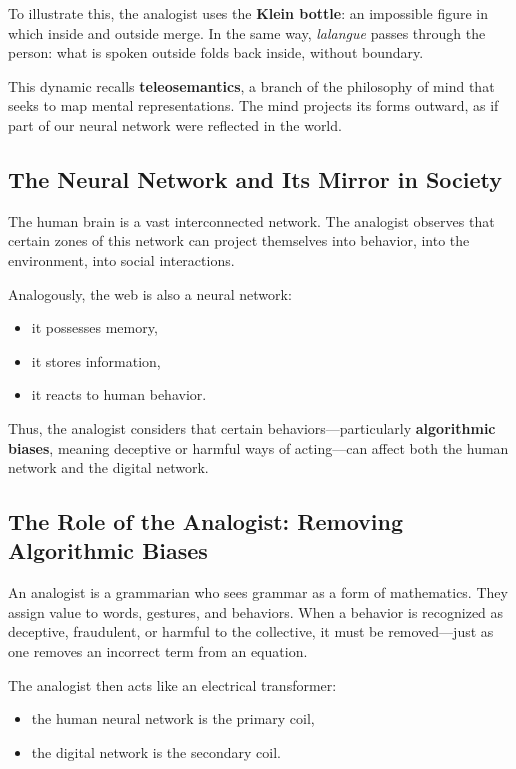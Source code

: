 \documentclass[12pt,oneside]{article}
\begin{document}
To illustrate this, the analogist uses the \textbf{Klein bottle}: an impossible figure in which inside and outside merge.  
In the same way, \textit{lalangue} passes through the person: what is spoken outside folds back inside, without boundary.

This dynamic recalls \textbf{teleosemantics}, a branch of the philosophy of mind that seeks to map mental representations. The mind projects its forms outward, as if part of our neural network were reflected in the world.

\subsection{The Neural Network and Its Mirror in Society}

The human brain is a vast interconnected network.  
The analogist observes that certain zones of this network can project themselves into behavior, into the environment, into social interactions.

Analogously, the web is also a neural network:
\begin{itemize}
    \item it possesses memory,
    \item it stores information,
    \item it reacts to human behavior.
\end{itemize}

Thus, the analogist considers that certain behaviors—particularly \textbf{algorithmic biases}, meaning deceptive or harmful ways of acting—can affect both the human network and the digital network.

\subsection{The Role of the Analogist: Removing Algorithmic Biases}

An analogist is a grammarian who sees grammar as a form of mathematics.  
They assign value to words, gestures, and behaviors.  
When a behavior is recognized as deceptive, fraudulent, or harmful to the collective, it must be removed—just as one removes an incorrect term from an equation.

The analogist then acts like an electrical transformer:
\begin{itemize}
    \item the human neural network is the primary coil,
    \item the digital network is the secondary coil.
\end{itemize}
\end{document}
